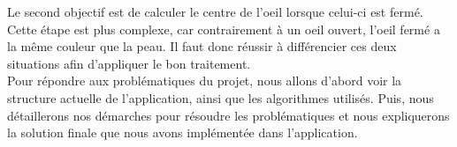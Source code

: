 Le second objectif est de calculer le centre de l'oeil lorsque celui-ci est fermé. Cette étape est plus complexe,
car contrairement à un oeil ouvert, l'oeil fermé a la même couleur que la peau. Il faut donc réussir à différencier ces
deux situations afin d'appliquer le bon traitement.\\ 

Pour répondre aux problématiques du projet, nous allons d'abord voir la structure actuelle de l'application, ainsi que les algorithmes
utilisés. Puis, nous détaillerons nos démarches pour résoudre les problématiques et nous expliquerons la solution finale que nous avons
implémentée dans l'application.\\

\newpage
